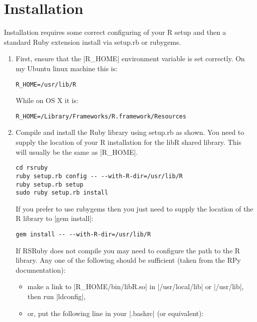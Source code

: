 \documentclass[a4paper,12pt]{book}
\begin{document}
\section{Installation}

Installation requires some correct configuring of your R setup and then a standard Ruby extension install via setup.rb or rubygems.

\begin{enumerate}

\item First, ensure that the |R_HOME| environment variable is set correctly. On my Ubuntu linux machine this is:

\begin{Verbatim} 
R_HOME=/usr/lib/R
\end{Verbatim}

While on OS X it is:

\begin{Verbatim} 
R_HOME=/Library/Frameworks/R.framework/Resources
\end{Verbatim}

\item Compile and install the Ruby library using setup.rb as shown. You need to supply the location of your R installation for the libR shared library. This will usually be the same as |R_HOME|.

\begin{Verbatim}
cd rsruby
ruby setup.rb config -- --with-R-dir=/usr/lib/R
ruby setup.rb setup
sudo ruby setup.rb install
\end{Verbatim}

If you prefer to use rubygems then you just need to supply the location of the R library to |gem install|:

\begin{Verbatim}
gem install -- --with-R-dir=/usr/lib/R
\end{Verbatim}

If RSRuby does not compile you may need to configure the path to the R library. Any one of the following should be sufficient (taken from the RPy documentation):

\begin{itemize}

\item make a link to |R_HOME/bin/libR.so| in |/usr/local/lib| or |/usr/lib|, then run |ldconfig|,

\item or, put the following line in your |.bashrc| (or equivalent):


\end{itemize}
\end{enumerate}
\end{document}

